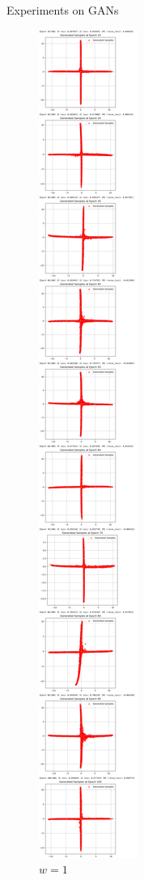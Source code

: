 \documentclass[final]{beamer}
\newlength{\colwidth}
\begin{document}
\begin{frame}[t]
\begin{columns}[t]
\begin{column}{\colwidth}
\begin{block}{Experiments on GANs}
\begin{figure}
\begin{minipage}{0.19\textwidth}
    \caption{$w=1$}
    \end{minipage}
    \begin{minipage}{0.19\textwidth}
    \centering
    \includegraphics[width=1\linewidth]{gan_cross/Jietu20250101-003251@2x.png}

\end{minipage}
\end{figure}
\end{block}
\end{column}
\end{columns}
\end{frame}
\end{document}
